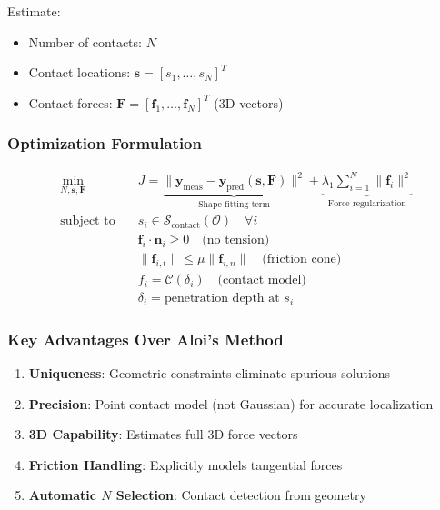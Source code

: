 \documentclass[11pt]{article}
\begin{document}
Estimate:
\begin{itemize}
    \item Number of contacts: $N$
    \item Contact locations: $\mathbf{s} = [s_1, \ldots, s_N]^T$
    \item Contact forces: $\mathbf{F} = [\mathbf{f}_1, \ldots, \mathbf{f}_N]^T$ (3D vectors)
\end{itemize}

\subsubsection{Optimization Formulation}

\begin{equation}
\begin{aligned}
\min_{N, \mathbf{s}, \mathbf{F}} \quad & J = \underbrace{\|\mathbf{y}_{\text{meas}} - \mathbf{y}_{\text{pred}}(\mathbf{s}, \mathbf{F})\|^2}_{\text{Shape fitting term}} + \underbrace{\lambda_1 \sum_{i=1}^{N} \|\mathbf{f}_i\|^2}_{\text{Force regularization}} \\
\text{subject to} \quad & s_i \in \mathcal{S}_{\text{contact}}(\mathcal{O}) \quad \forall i \\
& \mathbf{f}_i \cdot \mathbf{n}_i \geq 0 \quad \text{(no tension)} \\
& \|\mathbf{f}_{i,t}\| \leq \mu \|\mathbf{f}_{i,n}\| \quad \text{(friction cone)} \\
& f_i = \mathcal{C}(\delta_i) \quad \text{(contact model)} \\
& \delta_i = \text{penetration depth at } s_i
\end{aligned}
\end{equation}

\subsubsection{Key Advantages Over Aloi's Method}

\begin{enumerate}
    \item \textbf{Uniqueness}: Geometric constraints eliminate spurious solutions
    \item \textbf{Precision}: Point contact model (not Gaussian) for accurate localization
    \item \textbf{3D Capability}: Estimates full 3D force vectors
    \item \textbf{Friction Handling}: Explicitly models tangential forces
    \item \textbf{Automatic $N$ Selection}: Contact detection from geometry
\end{enumerate}
\end{document}
